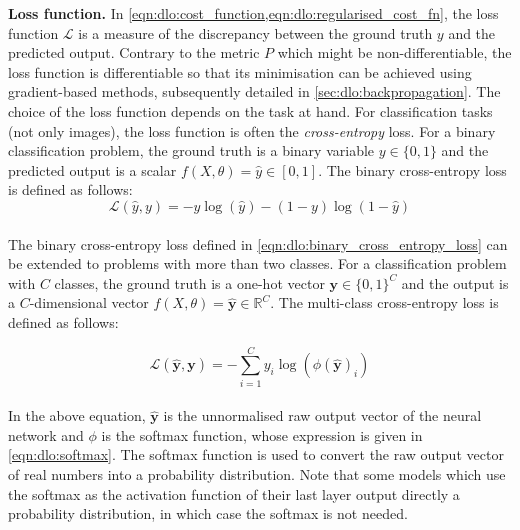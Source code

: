 \noindent\textbf{Loss function.} In
\cref{eqn:dlo:cost_function,eqn:dlo:regularised_cost_fn}, the loss function
$\mathcal{L}$ is a measure of the discrepancy between the ground truth $y$ and
the predicted output. Contrary to the metric $P$ which might be
non-differentiable, the loss function is differentiable so that its minimisation
can be achieved using gradient-based methods, subsequently detailed in
\cref{sec:dlo:backpropagation}. The choice of the loss function depends on the
task at hand. For classification tasks (not only images), the loss function is
often the \emph{cross-entropy} loss. For a binary classification problem, the
ground truth is a binary variable $y\in \{0,1\}$ and the predicted output is a
scalar $f(X,\theta)=\hat{y}\in[0,1]$. The binary cross-entropy loss is defined
as follows:\\

\begin{equation}
  \label{eqn:dlo:binary_cross_entropy_loss}
  \mathcal{L}(\hat{y}, y) = - y \log(\hat{y}) - (1-y) \log(1-\hat{y})
\end{equation}\\

\noindent The binary cross-entropy loss defined in
\cref{eqn:dlo:binary_cross_entropy_loss} can be extended to problems with more
than two classes. For a classification problem with $C$ classes, the ground
truth is a one-hot vector $\mathbf{y}\in \{0,1\}^C$ and the output is a
$C$-dimensional vector $f(X,\theta)=\hat{\mathbf{y}}\in\mathds{R}^C$. The
multi-class cross-entropy loss is defined as follows:

\begin{equation}
  \label{eqn:dlo:multiclass_cross_entropy_loss}
  \mathcal{L}(\hat{\mathbf{y}}, \mathbf{y}) = - \sum_{i=1}^C y_i \log \left( \phi(\mathbf{\hat{y}})_i \right)
\end{equation}\\


\noindent In the above equation, $\hat{\mathbf{y}}$ is the unnormalised raw
output vector of the neural network and $\phi$ is the softmax function, whose
expression is given in \cref{eqn:dlo:softmax}. The softmax function is used to
convert the raw output vector of real numbers into a probability distribution.
Note that some models which use the softmax as the activation function of their
last layer output directly a probability distribution, in which case the softmax
is not needed.\\

